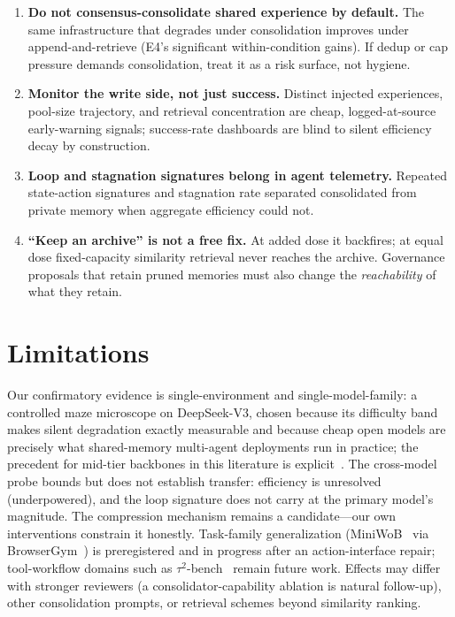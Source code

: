 \documentclass[11pt]{article}
\begin{document}
\begin{enumerate}[leftmargin=1.6em]
\item \textbf{Do not consensus-consolidate shared experience by default.} The same
infrastructure that degrades under consolidation improves under append-and-retrieve (E4's
significant within-condition gains). If dedup or cap pressure demands consolidation, treat it
as a risk surface, not hygiene.
\item \textbf{Monitor the write side, not just success.} Distinct injected experiences,
pool-size trajectory, and retrieval concentration are cheap, logged-at-source early-warning
signals; success-rate dashboards are blind to silent efficiency decay by construction.
\item \textbf{Loop and stagnation signatures belong in agent telemetry.} Repeated
state-action signatures and stagnation rate separated consolidated from private memory when
aggregate efficiency could not.
\item \textbf{``Keep an archive'' is not a free fix.} At added dose it backfires; at equal
dose fixed-capacity similarity retrieval never reaches the archive. Governance proposals that
retain pruned memories must also change the \emph{reachability} of what they retain.
\end{enumerate}

\section{Limitations}

Our confirmatory evidence is single-environment and single-model-family: a controlled maze
microscope on DeepSeek-V3, chosen because its difficulty band makes silent degradation exactly
measurable and because cheap open models are precisely what shared-memory multi-agent
deployments run in practice; the precedent for mid-tier backbones in this literature is
explicit~\citep{zhao2024expel}. The cross-model probe bounds but does not establish transfer:
efficiency is unresolved (underpowered), and the loop signature does not carry at the primary
model's magnitude. The compression mechanism remains a candidate---our own interventions
constrain it honestly. Task-family generalization (MiniWoB~\citep{shi2017wob,liu2018miniwob}
via BrowserGym~\citep{chezelles2024browsergym}) is preregistered and in progress after an
action-interface repair; tool-workflow domains such as
$\tau^2$-bench~\citep{tau2bench2025} remain future work. Effects may differ with stronger
reviewers (a consolidator-capability ablation is natural follow-up), other consolidation
prompts, or retrieval schemes beyond similarity ranking.
\end{document}

